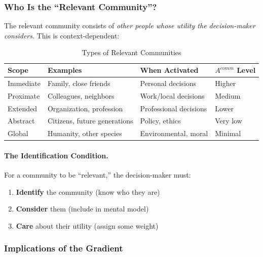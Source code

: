 \subsubsection{Who Is the ``Relevant Community''?}

The relevant community consists of \emph{other people whose utility the 
decision-maker considers}. This is context-dependent:

\begin{table}[htbp]
\centering
\caption{Types of Relevant Communities}
\label{tab:relevant-community}
\renewcommand{\arraystretch}{1.3}
\begin{tabular}{@{}llll@{}}
\toprule
\textbf{Scope} & \textbf{Examples} & \textbf{When Activated} & \textbf{$A^{comm}$ Level} \\
\midrule
Immediate & Family, close friends & Personal decisions & Higher \\
Proximate & Colleagues, neighbors & Work/local decisions & Medium \\
Extended & Organization, profession & Professional decisions & Lower \\
Abstract & Citizens, future generations & Policy, ethics & Very low \\
Global & Humanity, other species & Environmental, moral & Minimal \\
\bottomrule
\end{tabular}
\end{table}

\paragraph{The Identification Condition.}
For a community to be ``relevant,'' the decision-maker must:
\begin{enumerate}
\item \textbf{Identify} the community (know who they are)
\item \textbf{Consider} them (include in mental model)
\item \textbf{Care} about their utility (assign some weight)
\end{enumerate}

\subsubsection{Implications of the Gradient}


